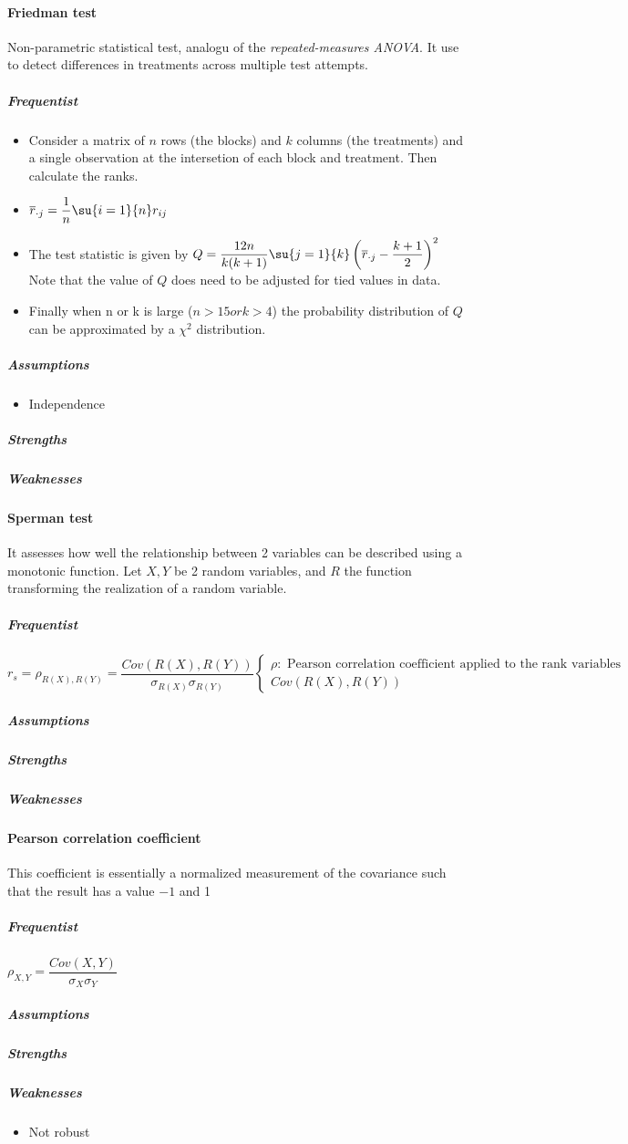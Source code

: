 \paragraph{Friedman test}
Non-parametric statistical test, analogu of the \emph{repeated-measures ANOVA}.
It use to detect differences in treatments across multiple test attempts.
\subparagraph{Frequentist}
\begin{itemize}
    \item Consider a matrix of $n$ rows (the blocks) and $k$ columns (the treatments)
    and a single observation at the intersetion of each block and treatment. Then 
    calculate the ranks.
    \item $\overline{r}_{\cdot j} = \dfrac{1}{n}\su{i=1}{n}r_{ij}$
    \item The test statistic is given by $Q = \dfrac{12n}{k(k+1)}\su{j=1}{k}\left(\overline{r}_{\cdot j} - \dfrac{k+1}{2}\right)^{2}$
    Note that the value of $Q$ does need to be adjusted for tied values in data.
    \item Finally when n or k is large ($n>15 or k>4$) the probability distribution of $Q$ can be approximated by
    a $\chi^{2}$ distribution.
\end{itemize}

\subparagraph{Assumptions}
\begin{itemize}
    \item Independence
\end{itemize}
\subparagraph{Strengths}
\subparagraph{Weaknesses}

\paragraph{Sperman test}
It assesses how well the relationship between 2 variables can be described using a monotonic function.
Let $X, Y$ be 2 random variables, and $R$ the function transforming the realization of a random variable.

\subparagraph{Frequentist}
$r_{s} = \rho_{R(X), R(Y)} = \dfrac{Cov\left(R(X), R(Y)\right)}{\sigma_{R(X)}\sigma_{R(Y)}}
\begin{cases}
\rho:\text{ Pearson correlation coefficient applied to the rank variables} \\
Cov\left(R(X), R(Y)\right)
\end{cases}$
\subparagraph{Assumptions}
\subparagraph{Strengths}
\subparagraph{Weaknesses}

\paragraph{Pearson correlation coefficient}
This coefficient is essentially a normalized measurement of the covariance such that the result
has a value $-1$ and 1
\subparagraph{Frequentist}
$\rho_{X, Y} = \dfrac{Cov\left(X, Y\right)}{\sigma_{X}\sigma_{Y}}$
\subparagraph{Assumptions}
\subparagraph{Strengths}
\subparagraph{Weaknesses}
\begin{itemize}
    \item Not robust
\end{itemize}

